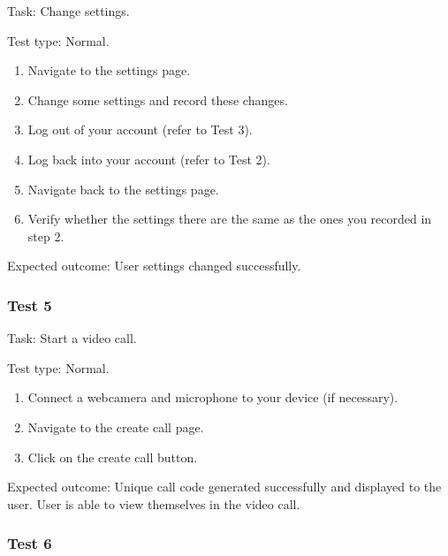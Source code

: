 {\sffamily Task:} Change settings.\\ 

{\color{gray} \hrulefill}

{\sffamily Test type: Normal.}\\

\begin{enumerate}
  \item Navigate to the settings page.
  \item Change some settings and record these changes.
  \item Log out of your account (refer to Test 3). 
  \item Log back into your account (refer to Test 2).
  \item Navigate back to the settings page.
  \item Verify whether the settings there are the same as the ones you recorded in step 2.
\end{enumerate}

{\sffamily Expected outcome:} User settings changed successfully. \\

{\color{gray} \hrulefill}

\subsubsection{Test 5}

{\sffamily Task:} Start a video call.\\ 

{\color{gray} \hrulefill}

{\sffamily Test type: Normal.}\\

\begin{enumerate}
  \item Connect a webcamera and microphone to your device (if necessary).
  \item Navigate to the create call page.
  \item Click on the create call button.
\end{enumerate}

{\sffamily Expected outcome:} Unique call code generated successfully 
and displayed to the user. User is able to view themselves in 
the video call.\\

{\color{gray} \hrulefill}

\subsubsection{Test 6}

